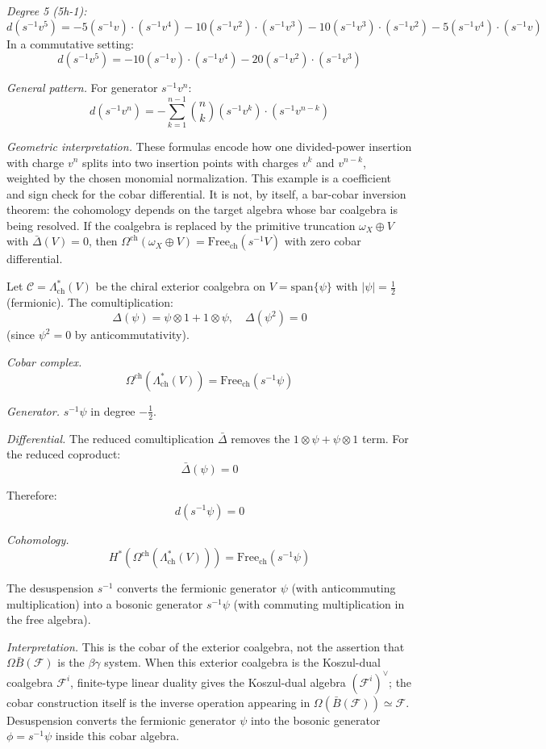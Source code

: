 \begin{example}
\emph{Degree 5 (5h-1):}
\[d(s^{-1}v^5) = -5(s^{-1}v) \cdot (s^{-1}v^4) - 10(s^{-1}v^2) \cdot (s^{-1}v^3) - 10(s^{-1}v^3) \cdot (s^{-1}v^2) - 5(s^{-1}v^4) \cdot (s^{-1}v)\]
In a commutative setting:
\[d(s^{-1}v^5) = -10(s^{-1}v) \cdot (s^{-1}v^4) - 20(s^{-1}v^2) \cdot (s^{-1}v^3)\]

\emph{General pattern.} For generator $s^{-1}v^n$:
\[d(s^{-1}v^n) = -\sum_{k=1}^{n-1} \binom{n}{k} (s^{-1}v^k) \cdot (s^{-1}v^{n-k})\]

\emph{Geometric interpretation.} These formulas encode how one
divided-power insertion with charge $v^n$ splits into two insertion
points with charges $v^k$ and $v^{n-k}$, weighted by the chosen
monomial normalization. This example is a coefficient and sign check
for the cobar differential. It is not, by itself, a bar-cobar
inversion theorem: the cohomology depends on the target algebra whose
bar coalgebra is being resolved. If the coalgebra is replaced by the
primitive truncation $\omega_X\oplus V$ with
$\bar\Delta(V)=0$, then
$\Omega^{\mathrm{ch}}(\omega_X\oplus V)=
\mathrm{Free}_{\mathrm{ch}}(s^{-1}V)$ with zero cobar differential.
\end{example}

\begin{example}\label{ex:cobar-fermion-complete}

Let $\mathcal{C} = \Lambda^*_{\text{ch}}(V)$ be the chiral exterior coalgebra on
$V = \text{span}\{\psi\}$ with $|\psi| = \frac{1}{2}$ (fermionic). The comultiplication:
\[\Delta(\psi) = \psi \otimes 1 + 1 \otimes \psi, \quad \Delta(\psi^2) = 0\]
(since $\psi^2 = 0$ by anticommutativity).

\emph{Cobar complex.}
\[\Omega^{\text{ch}}(\Lambda^*_{\text{ch}}(V)) = \text{Free}_{\text{ch}}(s^{-1}\psi)\]

\emph{Generator.} $s^{-1}\psi$ in degree $-\frac{1}{2}$.

\emph{Differential.}
The reduced comultiplication $\bar{\Delta}$ removes the $1 \otimes \psi + \psi \otimes 1$
term. For the reduced coproduct:
\[\bar{\Delta}(\psi) = 0\]

Therefore:
\[d(s^{-1}\psi) = 0\]

\emph{Cohomology.}
\[H^*(\Omega^{\text{ch}}(\Lambda^*_{\text{ch}}(V))) = \text{Free}_{\text{ch}}(s^{-1}\psi)\]

The desuspension $s^{-1}$ converts the fermionic generator $\psi$ (with
anticommuting multiplication) into a bosonic generator $s^{-1}\psi$ (with commuting
multiplication in the free algebra).

\emph{Interpretation.} This is the cobar of the exterior coalgebra, not
the assertion that $\Omega\bar{B}(\mathcal F)$ is the
$\beta\gamma$ system. When this exterior coalgebra is the
Koszul-dual coalgebra $\mathcal F^i$, finite-type linear duality gives
the Koszul-dual algebra $(\mathcal F^i)^\vee$; the cobar construction
itself is the inverse operation appearing in
$\Omega(\bar B(\mathcal F))\simeq\mathcal F$. Desuspension converts the
fermionic generator $\psi$ into the bosonic generator
$\phi=s^{-1}\psi$ inside this cobar algebra.
\end{example}

